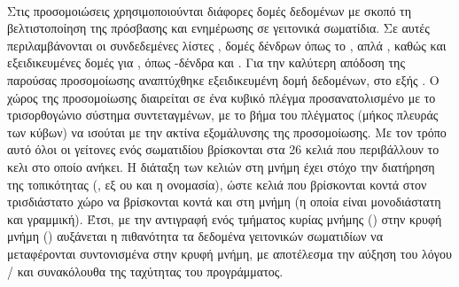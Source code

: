 \paragraph{} Στις προσομοιώσεις  χρησιμοποιούνται διάφορες δομές δεδομένων με
σκοπό τη βελτιστοποίηση της πρόσβασης και ενημέρωσης σε γειτονικά σωματίδια. Σε αυτές
περιλαμβάνονται οι συνδεδεμένες λίστες \cite{monaghan1985refined, shao2003787}, δομές
δένδρων όπως το  \cite{losasso2004simulating}, απλά 
\cite{wang2012real}, καθώς και εξειδικευμένες δομές για , όπως -δένδρα
\cite{zhou2008real} και  \cite{goswami2010interactive}. Για την καλύτερη
απόδοση της παρούσας προσομοίωσης αναπτύχθηκε εξειδικευμένη δομή δεδομένων, στο εξής
. Ο χώρος της προσομοίωσης διαιρείται σε ένα κυβικό πλέγμα προσανατολισμένο
με το τρισορθογώνιο σύστημα συντεταγμένων, με το βήμα του πλέγματος (μήκος πλευράς των
κύβων) να ισούται με την ακτίνα εξομάλυνσης της προσομοίωσης. Με τον τρόπο αυτό όλοι οι
γείτονες ενός σωματιδίου βρίσκονται στα 26 κελιά που περιβάλλουν το κελι στο οποίο
ανήκει. Η διάταξη των κελιών στη μνήμη έχει στόχο την διατήρηση της τοπικότητας
(, εξ ου και η ονομασία), ώστε κελιά που βρίσκονται κοντά στον
τρισδιάστατο χώρο να βρίσκονται κοντά και στη μνήμη (η οποία είναι μονοδιάστατη και
γραμμική). Έτσι, με την αντιγραφή ενός τμήματος κυρίας μνήμης () στην κρυφή μνήμη
() αυξάνεται η πιθανότητα τα δεδομένα γειτονικών σωματιδίων να μεταφέρονται
συντονισμένα στην κρυφή μνήμη, με αποτέλεσμα την αύξηση του λόγου / και
συνακόλουθα της ταχύτητας του προγράμματος.

